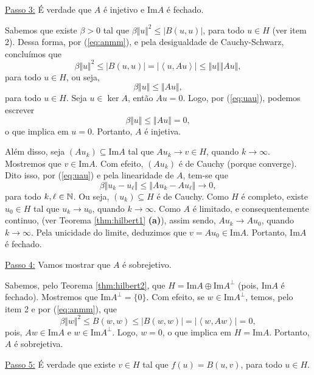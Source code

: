 \begin{prf}
    \underline{Passo 3:} É verdade que $A$ é injetivo e $\mathrm{Im}A$ é fechado.

    Sabemos que existe $\beta > 0$ tal que $\beta \Vert u \Vert^2 \leqslant |B(u,u)|$, para todo $u \in H$ (ver item 2). Dessa forma, por (\ref{eq:anmm}), e pela desigualdade de Cauchy-Schwarz, concluímos que
    \[
        \beta \Vert u \Vert^2 \leqslant |B(u,u)| = | \left\langle u, Au \right\rangle | \leqslant \Vert u \Vert \Vert Au \Vert,
    \]
    para todo $u \in H$, ou seja,
    \begin{equation} \label{eq:uau}
        \beta \Vert u \Vert \leqslant \Vert Au \Vert,
    \end{equation}
    para todo $u \in H$.
    Seja $u \in \ker A$, então $Au = 0$. Logo, por (\ref{eq:uau}), podemos escrever
    \[
        \beta \Vert u \Vert \leqslant \Vert Au \Vert = 0,
    \]
    o que implica em $u = 0$.
    Portanto, $A$ é injetiva.

    Além disso, seja $(Au_k) \subseteq \mathrm{Im} A$ tal que $A u_k \to v \in H$, quando $k \to \infty$.
    Mostremos que $v \in \mathrm{Im}A$.
    Com efeito, $(Au_k)$ é de Cauchy (porque converge). Dito isso, por (\ref{eq:uau}) e pela linearidade de $A$, tem-se que
    \[
        \beta \Vert u_k - u_\ell \Vert \leqslant \Vert Au_k - Au_\ell \Vert \to 0,
    \]
    para todo $k, \ell \in \mathbb{N}$.
    Ou seja, $(u_k) \subseteq H$ é de Cauchy.
    Como $H$ é completo, existe $u_0 \in H$ tal que $u_k \to u_0$, quando $k \to \infty$. Como $A$ é limitado, e consequentemente continuo, (ver Teorema \ref{thm:hilbert1} \textbf{(a)}), assim sendo, $Au_k \to Au_0$, quando $k \to \infty$.
    Pela unicidade do limite, deduzimos que $v = Au_0 \in \mathrm{Im}A$.
    Portanto, $\mathrm{Im}A$ é fechado.

    \underline{Passo 4:} Vamos mostrar que $A$ é sobrejetivo.

    Sabemos, pelo Teorema \ref{thm:hilbert2}, que $H = \mathrm{Im}A \oplus \mathrm{Im}A^\perp$ (pois, $\mathrm{Im}A$ é fechado). Mostremos que $\mathrm{Im}A^\perp = \{0\}$.
    Com efeito, se $w \in \mathrm{Im}A^\perp$, temos, pelo item 2 e por (\ref{eq:anmm}), que
    \[
        \beta \Vert w \Vert^2 \leqslant B(w,w) \leqslant | B(w,w) | = | \left\langle w, Aw \right\rangle | = 0,
    \]
    pois, $Aw \in \mathrm{Im}A$ e $w \in \mathrm{Im}A^\perp$.
    Logo, $w = 0$, o que implica em $H = \mathrm{Im}A$.
    Portanto, $A$ é sobrejetiva.

    \underline{Passo 5:} É verdade que existe $v \in H$ tal que $f(u) = B(u,v)$, para todo $u \in H$.


\end{prf}
